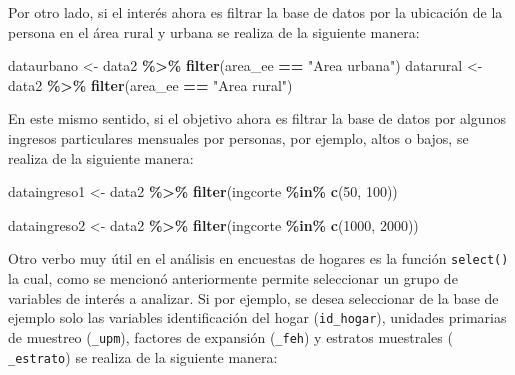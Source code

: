 \documentclass[
  spanish,
  12pt,
]{book}
\newenvironment{Shaded}{\begin{snugshade}}{\end{snugshade}}
\newcommand{\DecValTok}[1]{\textcolor[rgb]{0.00,0.00,0.81}{#1}}
\newcommand{\FunctionTok}[1]{\textcolor[rgb]{0.13,0.29,0.53}{\textbf{#1}}}
\newcommand{\NormalTok}[1]{#1}
\newcommand{\OtherTok}[1]{\textcolor[rgb]{0.56,0.35,0.01}{#1}}
\newcommand{\SpecialCharTok}[1]{\textcolor[rgb]{0.81,0.36,0.00}{\textbf{#1}}}
\newcommand{\StringTok}[1]{\textcolor[rgb]{0.31,0.60,0.02}{#1}}
\begin{document}
Por otro lado, si el interés ahora es filtrar la base de datos por la ubicación de la persona en el área rural y urbana se realiza de la siguiente manera:

\begin{Shaded}
\begin{Highlighting}[]
\NormalTok{dataurbano }\OtherTok{\textless{}{-}}\NormalTok{ data2 }\SpecialCharTok{\%\textgreater{}\%} 
              \FunctionTok{filter}\NormalTok{(area\_ee }\SpecialCharTok{==} \StringTok{"Area urbana"}\NormalTok{)}
\NormalTok{datarural }\OtherTok{\textless{}{-}}\NormalTok{ data2 }\SpecialCharTok{\%\textgreater{}\%} 
             \FunctionTok{filter}\NormalTok{(area\_ee }\SpecialCharTok{==} \StringTok{"Area rural"}\NormalTok{) }
\end{Highlighting}
\end{Shaded}

En este mismo sentido, si el objetivo ahora es filtrar la base de datos por algunos ingresos particulares mensuales por personas, por ejemplo, altos o bajos, se realiza de la siguiente manera:

\begin{Shaded}
\begin{Highlighting}[]
\NormalTok{dataingreso1 }\OtherTok{\textless{}{-}}\NormalTok{ data2 }\SpecialCharTok{\%\textgreater{}\%} 
                \FunctionTok{filter}\NormalTok{(ingcorte }\SpecialCharTok{\%in\%} \FunctionTok{c}\NormalTok{(}\DecValTok{50}\NormalTok{, }\DecValTok{100}\NormalTok{))}

\NormalTok{dataingreso2 }\OtherTok{\textless{}{-}}\NormalTok{ data2 }\SpecialCharTok{\%\textgreater{}\%} 
                \FunctionTok{filter}\NormalTok{(ingcorte }\SpecialCharTok{\%in\%} \FunctionTok{c}\NormalTok{(}\DecValTok{1000}\NormalTok{, }\DecValTok{2000}\NormalTok{))}
\end{Highlighting}
\end{Shaded}

Otro verbo muy útil en el análisis en encuestas de hogares es la función \texttt{select()} la cual, como se mencionó anteriormente permite seleccionar un grupo de variables de interés a analizar. Si por ejemplo, se desea seleccionar de la base de ejemplo solo las variables identificación del hogar (\texttt{id\_hogar}), unidades primarias de muestreo (\texttt{\_upm}), factores de expansión (\texttt{\_feh}) y estratos muestrales ( \texttt{\_estrato}) se realiza de la siguiente manera:
\end{document}
